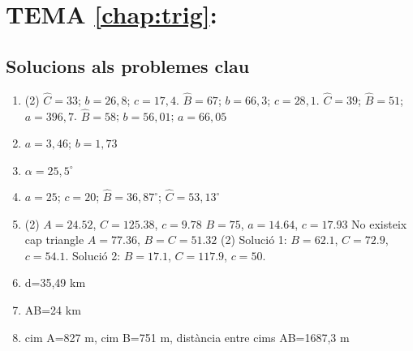 
\section*{TEMA \ref{chap:trig}: }
\subsection*{Solucions als problemes clau \simbolclau}
\begin{enumerate}
	\item[\clauref{trig:ex16}] \begin{tasks}(2) \task $\hat C=33$; $b=26,8$; $c=17,4$. \task  $\hat B=67$; $b=66,3$; $c=28,1$. \task  $\hat C=39$; $\hat B=51$; $a=396,7$. \task  $\hat B=58$; $b=56,01$; $a=66,05$    \end{tasks}
	\item[\clauref{trig:ex17}] $a=3,46$; $b=1,73$
	\item[\clauref{trig:ex18}] $\alpha=25,5^\circ$
	\item[\clauref{trig:ex19}] $a=25$; $c=20$; $\hat B=36,87^\circ$; $\hat C=53,13^\circ$
	\item[\clauref{trig:ex40}] \begin{tasks}(2) 
		\task $A=24.52$, $C=125.38$, $c=9.78$
		\task $B=75$, $a=14.64$, $c=17.93$
		\task No existeix cap triangle
		\task $A=77.36$, $B=C=51.32$ 
		\task*(2) Solució 1: $B=62.1$, $C=72.9$, $c=54.1$. Solució 2: $B=17.1$, $C=117.9$, $c=50$.
	\end{tasks}
	\item[\clauref{t3-r5}] d=35,49 km 
	\item[\clauref{t3-r6}] AB=24 km
	\item[\clauref{t3-r9}] cim A=827 m, cim B=751 m, distància entre cims AB=1687,3 m
\end{enumerate}

